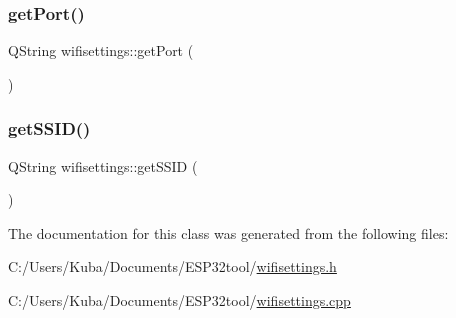 \mbox{\label{classwifisettings_a74e1fb264f4b4dfb7d1277d2f895d177}} 
\subsubsection{\texorpdfstring{get\+Port()}{getPort()}}
{\footnotesize\ttfamily Q\+String wifisettings\+::get\+Port (\begin{DoxyParamCaption}{ }\end{DoxyParamCaption})}

\mbox{\label{classwifisettings_a2d5a23c9441438402bf9a858bb742a78}} 
\subsubsection{\texorpdfstring{get\+S\+S\+I\+D()}{getSSID()}}
{\footnotesize\ttfamily Q\+String wifisettings\+::get\+S\+S\+ID (\begin{DoxyParamCaption}{ }\end{DoxyParamCaption})}



The documentation for this class was generated from the following files\+:\begin{DoxyCompactItemize}
\item 
C\+:/\+Users/\+Kuba/\+Documents/\+E\+S\+P32tool/\hyperlink{wifisettings_8h}{wifisettings.\+h}\item 
C\+:/\+Users/\+Kuba/\+Documents/\+E\+S\+P32tool/\hyperlink{wifisettings_8cpp}{wifisettings.\+cpp}\end{DoxyCompactItemize}
